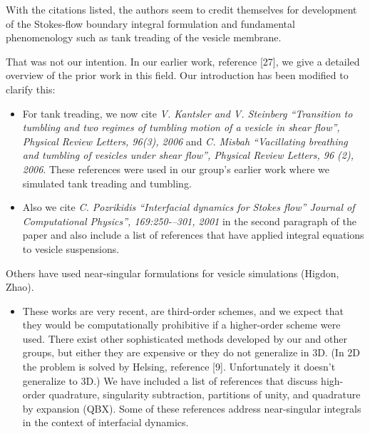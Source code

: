 \documentclass[11pt]{article}
\newcommand{\comment}[1]{{\color{blue} #1}}
\begin{document}
\comment{With the citations listed, the authors seem to credit themselves
for development of the Stokes-flow boundary integral formulation and
fundamental phenomenology such as tank treading of the vesicle
membrane.}

That was not our intention. In our earlier work, reference [27], we
give a detailed overview of the prior work in this field. Our
introduction has been modified to clarify this:
\begin{itemize}
  \item For tank treading, we now cite {\em V. Kantsler and V.
  Steinberg ``Transition to tumbling and two regimes of tumbling motion
  of a vesicle in shear flow'', Physical Review Letters, 96(3), 2006}
  and {\em C. Misbah ``Vacillating breathing and tumbling of vesicles
  under shear flow'', Physical Review Letters, 96 (2), 2006}.  These
  references were used in our group's earlier work where we simulated
  tank treading and tumbling.

  \item Also we cite {\em C. Pozrikidis ``Interfacial dynamics for
  Stokes flow'' Journal of Computational Physics'', 169:250-–301,
  2001} in the second paragraph of the paper and also include a list
  of references that have applied integral equations to vesicle
  suspensions.
\end{itemize}

\comment{Others have used near-singular formulations for vesicle
simulations (Higdon, Zhao).}

\begin{itemize}
  \item These works are very recent, are third-order schemes, and we
  expect that they would be computationally prohibitive if a
  higher-order scheme were used. There exist other sophisticated methods
  developed by our and other groups, but either they are expensive or
  they do not generalize in 3D.  (In 2D the problem is solved by
  Helsing, reference [9]. Unfortunately it doesn't generalize to 3D.)
  We have included a list of references that discuss high-order
  quadrature, singularity subtraction, partitions of unity, and
  quadrature by expansion (QBX).  Some of these references address
  near-singular integrals in the context of interfacial dynamics.
  \end{itemize}
\end{document}
